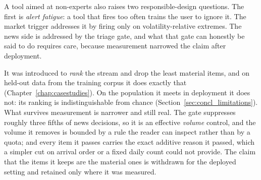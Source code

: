 A tool aimed at non-experts also raises two responsible-design questions. The first is \emph{alert
fatigue}: a tool that fires too often trains the user to ignore it. The market trigger addresses it by
firing only on volatility-relative extremes. The news side is addressed by the triage gate, and what
that gate can honestly be said to do requires care, because measurement narrowed the claim after
deployment.

It was introduced to \emph{rank} the stream and drop the least material items, and on held-out data
from the training corpus it does exactly that (Chapter~\ref{chap:casestudies}). On the population it
meets in deployment it does not: its ranking is indistinguishable from chance
(Section~\ref{sec:concl_limitations}). What survives measurement is narrower and still real. The gate
suppresses roughly three fifths of news decisions, so it is an effective \emph{volume} control, and
the volume it removes is bounded by a rule the reader can inspect rather than by a quota; and every
item it passes carries the exact additive reason it passed, which a simpler cut on arrival order or a
fixed daily count could not provide. The claim that the items it keeps are the material ones is
withdrawn for the deployed setting and retained only where it was measured.

